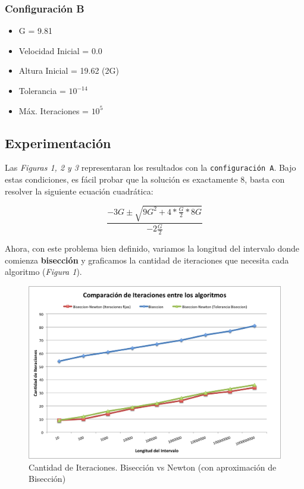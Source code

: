 \documentclass[a4paper]{article}
\begin{document}
\subsubsection{Configuración B}
\begin{itemize}
  \item{G = 9.81}
  \item{Velocidad Inicial = 0.0} 
  \item{Altura Inicial = 19.62 (2G)} 
  \item{Tolerancia = $10^{-14}$} 
  \item{Máx. Iteraciones = $10^5$}
\end{itemize}

\subsection{Experimentación}
Las \textit{Figuras 1, 2 y 3} representaran los resultados con la \texttt{configuración A}.
Bajo estas condiciones, es fácil probar que la solución es exactamente 8, basta con resolver la siguiente ecuación cuadrática:

\begin{displaymath}
  \frac{-3G \pm \sqrt{9G^2 + 4*\frac{G}{2}*8G}}{-2\frac{G}{2}}
\end{displaymath}

Ahora, con este problema bien definido, variamos la longitud del intervalo donde comienza \textbf{bisección} y graficamos la cantidad de iteraciones que necesita cada algoritmo (\textit{Figura 1}).

\begin{figure}[H]
  \centering
  \includegraphics[scale=0.80]{graficos/1-Biseccion_vs_BiseccionNewton.png}
  \caption{Cantidad de Iteraciones. Bisección vs Newton (con aproximación de Bisección) }
\end{figure}
\end{document}

